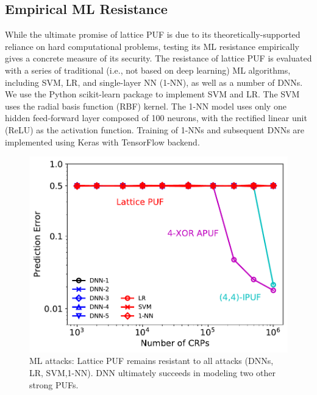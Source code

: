 
\subsection{Empirical ML Resistance}

While the ultimate promise of lattice PUF is due to its theoretically-supported reliance on hard computational problems,
testing its ML resistance empirically gives a concrete measure of its security. The resistance of lattice PUF is evaluated with a series of traditional (i.e., not based on deep learning) ML algorithms, including SVM, LR, and single-layer NN (1-NN), as well as a number of DNNs.
We use the Python scikit-learn %
package to implement SVM and LR.  
The SVM uses the radial basis function (RBF) kernel.
The 1-NN model uses only one hidden feed-forward layer composed of 100 neurons, with the rectified linear unit (ReLU) as the activation function. 
Training of 1-NNs and subsequent DNNs are implemented using Keras %
with TensorFlow %
backend. 

\begin{figure}[t!]
\centering
\includegraphics[width = 0.7\linewidth]{./figs/ml_attack_dnn_all_puf_5.pdf}
\caption{ML attacks: Lattice PUF remains resistant to all attacks (DNNs, LR, SVM,1-NN). DNN ultimately succeeds in modeling two other strong PUFs.}
\label{fig:ml_attack_2}
\end{figure}

